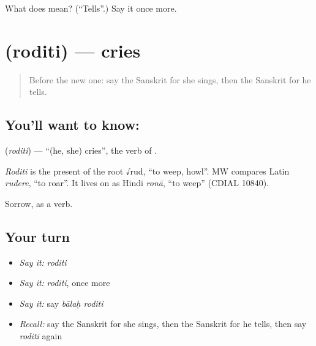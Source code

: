 \begin{tcolorbox}[breakable,colback=teal!4,colframe=teal!35!black,title={Before you move on}]
What does  mean? (\textquotedblleft{}Tells\textquotedblright{}.) Say it once more.
\end{tcolorbox}
\section[\texorpdfstring{\sk{रोदिति} (roditi)}{रोदिति (roditi)}]{ (roditi) — cries}

\label{lesson:SA-C73-cries}



\begin{quote}
Before the new one: say the Sanskrit for she sings, then the Sanskrit for he tells.
\end{quote}

\subsection*{You'll want to know: }
\textbf{} (\emph{roditi}) — \textquotedblleft{}(he, she) cries\textquotedblright{}, the verb of \textbf{}.

\begin{cousinweb}
\emph{Roditi} is the present of the root √rud, \textquotedblleft{}to weep, howl\textquotedblright{}. MW compares Latin \emph{rudere}, \textquotedblleft{}to roar\textquotedblright{}. It lives on as Hindi \emph{ronā}, \textquotedblleft{}to weep\textquotedblright{} (CDIAL 10840).
\end{cousinweb}

\begin{grammarlens}[title={What you've built}]
Sorrow, as a verb.
\end{grammarlens}

\subsection*{Your turn}
\begin{itemize}
\raggedright
  \item \emph{Say it:} \emph{roditi}
  \item \emph{Say it:} \emph{roditi}, once more
  \item \emph{Say it:} say \emph{bālaḥ roditi}
  \item \emph{Recall:} say the Sanskrit for she sings, then the Sanskrit for he tells, then say \emph{roditi} again
\end{itemize}


